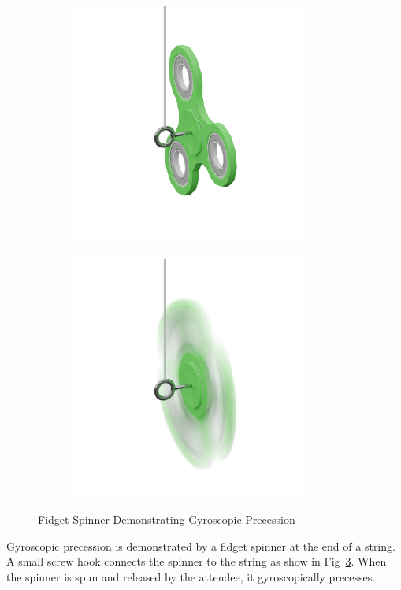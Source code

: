 \documentclass[12pt, a4paper]{article}
\begin{document}
\begin{figure}[H]
    \centering
    \begin{subfigure}{.5\textwidth}
        \centering
        \includegraphics[width=8cm]{stoppedfidget.png}
        \label{}
    \end{subfigure}%
    \begin{subfigure}{.5\textwidth}
        \centering
        \includegraphics[width=8cm]{spinningfidget.png}
        \label{}
    \end{subfigure}
    \caption{Fidget Spinner Demonstrating Gyroscopic Precession}
    \label{precession}
\end{figure}
Gyroscopic precession is demonstrated by a fidget spinner at the end of a string. A small screw hook connects the spinner to the string as show in Fig~\ref{precession}. When the spinner is spun and released by the attendee, it gyroscopically precesses.
\end{document}
